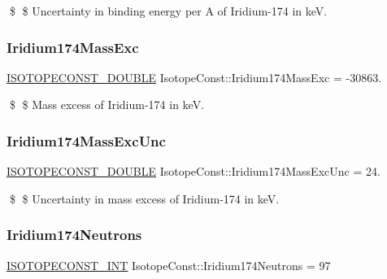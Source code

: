 \$ \$ Uncertainty in binding energy per A of Iridium-\/174 in keV. \mbox{\label{group___isotope_const-_iridium-_ir174_gacd511480c05979d19c3a677c4b8844dd}} 
\subsubsection{\texorpdfstring{Iridium174\+Mass\+Exc}{Iridium174MassExc}}
{\footnotesize\ttfamily \mbox{\hyperlink{group___isotope_const-_macros_ga8f45a7272ce02c0b4c65c44636ed719a}{I\+S\+O\+T\+O\+P\+E\+C\+O\+N\+S\+T\+\_\+\+D\+O\+U\+B\+LE}} Isotope\+Const\+::\+Iridium174\+Mass\+Exc = -\/30863.}

\$ \$ Mass excess of Iridium-\/174 in keV. \mbox{\label{group___isotope_const-_iridium-_ir174_ga2803642d3ce7a29bc990b9619003a6fb}} 
\subsubsection{\texorpdfstring{Iridium174\+Mass\+Exc\+Unc}{Iridium174MassExcUnc}}
{\footnotesize\ttfamily \mbox{\hyperlink{group___isotope_const-_macros_ga8f45a7272ce02c0b4c65c44636ed719a}{I\+S\+O\+T\+O\+P\+E\+C\+O\+N\+S\+T\+\_\+\+D\+O\+U\+B\+LE}} Isotope\+Const\+::\+Iridium174\+Mass\+Exc\+Unc = 24.}

\$ \$ Uncertainty in mass excess of Iridium-\/174 in keV. \mbox{\label{group___isotope_const-_iridium-_ir174_ga0d5c407ce6b653e13892695cdfceb0a4}} 
\subsubsection{\texorpdfstring{Iridium174\+Neutrons}{Iridium174Neutrons}}
{\footnotesize\ttfamily \mbox{\hyperlink{group___isotope_const-_macros_ga5f18360b3e99483a35c32d789e62621c}{I\+S\+O\+T\+O\+P\+E\+C\+O\+N\+S\+T\+\_\+\+I\+NT}} Isotope\+Const\+::\+Iridium174\+Neutrons = 97}

